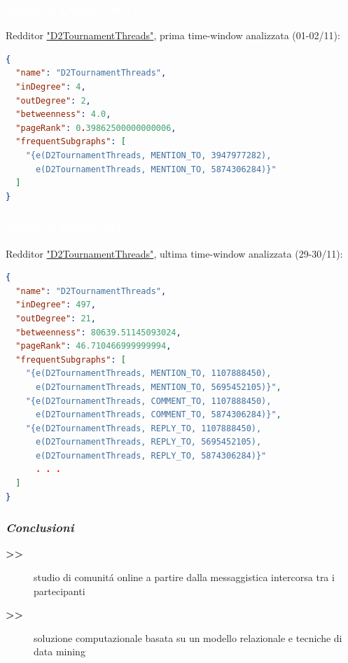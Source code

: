 \documentclass[11pt,xcolor={usenames,dvipsnames,svgnames},compress]{beamer}
\newcommand{\highlighttext}[2][yellow]{{\colorbox{#1}{\textcolor{white}{#2}}}}
\begin{document}
\begin{frame}[fragile]
  \frametitle{\highlighttext[tomato1]{\textbf{\emph{Risultati Qualitativi (1)}}}}
  
Redditor \url{"D2TournamentThreads"}, prima time-window analizzata (01-02/11):  
  
\begin{lstlisting}[language=json]
{
  "name": "D2TournamentThreads",
  "inDegree": 4,
  "outDegree": 2,
  "betweenness": 4.0,
  "pageRank": 0.39862500000000006,
  "frequentSubgraphs": [
    "{e(D2TournamentThreads, MENTION_TO, 3947977282),
      e(D2TournamentThreads, MENTION_TO, 5874306284)}"
  ]
}
\end{lstlisting}
  
\end{frame} 

\begin{frame}[fragile]
  \frametitle{\highlighttext[tomato1]{\textbf{\emph{Risultati Qualitativi (2)}}}}
  
Redditor \url{"D2TournamentThreads"}, ultima time-window analizzata (29-30/11):    
  
\begin{lstlisting}[language=json]
{
  "name": "D2TournamentThreads",
  "inDegree": 497,
  "outDegree": 21,
  "betweenness": 80639.51145093024,
  "pageRank": 46.710466999999994,
  "frequentSubgraphs": [
    "{e(D2TournamentThreads, MENTION_TO, 1107888450),
      e(D2TournamentThreads, MENTION_TO, 5695452105)}",
    "{e(D2TournamentThreads, COMMENT_TO, 1107888450),
      e(D2TournamentThreads, COMMENT_TO, 5874306284)}",
    "{e(D2TournamentThreads, REPLY_TO, 1107888450),
      e(D2TournamentThreads, REPLY_TO, 5695452105),
      e(D2TournamentThreads, REPLY_TO, 5874306284)}"
      . . .
  ]
}
\end{lstlisting}
  
\end{frame} 

\begin{frame}
  \frametitle{\textcolor{lacamlilac}{\textbf{\emph{Conclusioni}}}}
  
  \begin{description}
  \item[\textbf{>>}] studio di comunit{\'a} online a partire dalla messaggistica intercorsa tra i partecipanti
  \item[\textbf{>>}] soluzione computazionale basata su un modello relazionale e tecniche di data mining
  \end{description} \bigskip 
  
\end{frame}
\end{document}
